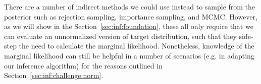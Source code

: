 There are a number of indirect methods we could use instead to sample from the posterior
such as rejection sampling, importance sampling, and MCMC.  However, as we will show
in the Section~\ref{sec:inf:foundation}, these all only require that we can evaluate an unnormalized version of
target distribution, such that they side-step the need to calculate the marginal 
likelihood.  Nonetheless, knowledge of the marginal likelihood can still be helpful in
a number of scenarios (e.g. in adapting our inference algorithm) for the reasons outlined in 
Section~\ref{sec:inf:challenge:norm}.